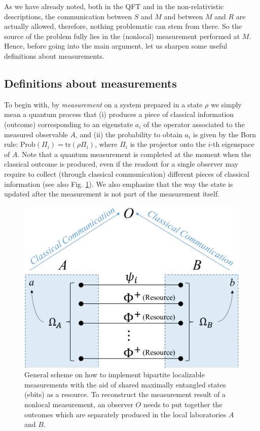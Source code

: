 \documentclass[a4paper,twocolumn,11pt,accepted=2024-02-14]{quantumarticle}
\begin{document}
 
As we have already noted, both in the QFT and in the non-relativistic descriptions, the communication between $S$ and $M$ and between $M$ and $R$ are actually allowed, therefore, nothing problematic can stem from there. So the source of the problem fully lies in the (nonlocal) measurement performed at $M$.
Hence, before going into the main argument, let us  sharpen some useful definitions about measurements. 

\subsection{Definitions about measurements}
\label{defmeas}
To begin with, by \textit{measurement} on a system prepared in a state $\rho$ we simply mean a quantum process that (i) produces a piece of classical information (outcome)  corresponding to an eigenstate $a_i$ of the operator associated to the measured observable $A$, and (ii) the probability to obtain $a_i$ is given by the Born rule: $ {\text{Prob}}(\Pi_i)= \text{tr} (\rho \Pi_i)$, where $\Pi_i$ is the projector onto the $i$-th eigenspace of $A$.  Note that a quantum measurement is completed at the moment when the classical outcome is produced, even if the readout for a single observer may require to collect (through classical communication) different pieces of classical information (see also Fig. \ref{figloca}). We also emphasize that the way the state is updated after the measurement is not part of the measurement itself.  
 \begin{figure}[ht]
    \centering
    \includegraphics[width=.44\textwidth]{localiza.png}
    \caption{General scheme on how to implement bipartite localizable measurements with the aid of shared maximally entangled states (ebits) as a resource. To reconstruct the measurement result of a nonlocal measurement, an observer $O$ needs to put together the outcomes which are separately produced in the local laboratories $A$ and $B$.}
    \label{figloca}
\end{figure}
\end{document}

